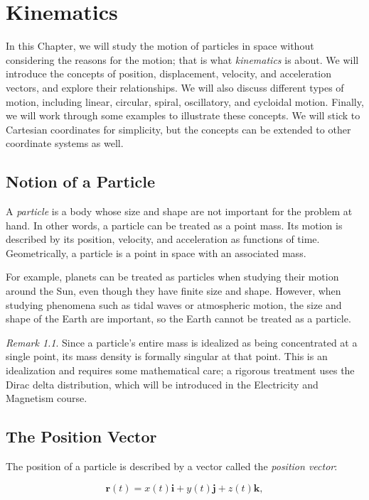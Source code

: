 \documentclass[../main.tex]{subfiles}
\theoremstyle{remark}
\newtheorem*{remark}{Remark}
\begin{document}
\chapter{Kinematics}

In this Chapter, we will study the motion of particles in space without considering the reasons for the motion; that is what \emph{kinematics} is about. We will introduce the concepts of position, displacement, velocity, and acceleration vectors, and explore their relationships. We will also discuss different types of motion, including linear, circular, spiral, oscillatory, and cycloidal motion. Finally, we will work through some examples to illustrate these concepts. We will stick to Cartesian coordinates for simplicity, but the concepts can be extended to other coordinate systems as well.

\section{Notion of a Particle}
A \emph{particle} is a body whose size and shape are not important for the problem at hand. In other words, a particle can be treated as a point mass. Its motion is described by its position, velocity, and acceleration as functions of time. Geometrically, a particle is a point in space with an associated mass.

For example, planets can be treated as particles when studying their motion around the Sun, even though they have finite size and shape. However, when studying phenomena such as tidal waves or atmospheric motion, the size and shape of the Earth are important, so the Earth cannot be treated as a particle.

\begin{remark}
Since a particle's entire mass is idealized as being concentrated at a single point, its mass density is formally singular at that point. This is an idealization and requires some mathematical care; a rigorous treatment uses the Dirac delta distribution, which will be introduced in the Electricity and Magnetism course.
\end{remark}


\section{The Position Vector}

The position of a particle is described by a vector called the \emph{position vector}:

\begin{equation}
\mathbf{r}(t) = x(t)\mathbf{i} + y(t)\mathbf{j} + z(t)\mathbf{k},
\end{equation}
\end{document}
